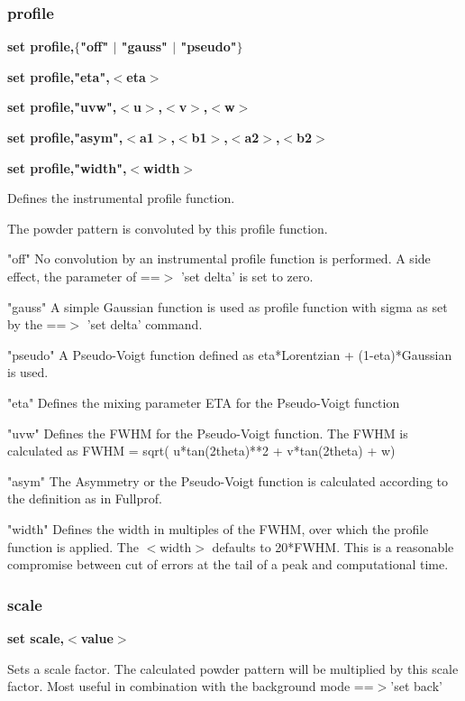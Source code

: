 \subsubsection{profile}
{\bf set profile,$ \{$"off" $| $ "gauss" $| $ "pseudo"$\} $ \par }
{\bf set profile,"eta",$ <$eta$> $ \par }
{\bf set profile,"uvw",$ <$u$> $,$ <$v$> $,$ <$w$> $ \par }
{\bf set profile,"asym",$ <$a1$> $,$ <$b1$> $,$ <$a2$> $,$ <$b2$> $ \par }
{\bf set profile,"width",$ <$width$> $ \par }
\par
\vspace{3pt}
Defines the instrumental profile function. 
\par
The powder pattern is convoluted by this profile function. 
\par
"off" 
No convolution by an instrumental profile function is performed. 
A side effect, the parameter of ==$> $ 'set delta' is set to zero. 
\par
"gauss" 
A simple Gaussian function is used as profile function with 
sigma as set by the ==$> $ 'set delta' command. 
\par
"pseudo" 
A Pseudo-Voigt function defined as eta*Lorentzian + (1-eta)*Gaussian 
is used. 
\par
"eta" 
Defines the mixing parameter ETA for the Pseudo-Voigt function 
\par
"uvw" 
Defines the FWHM for the Pseudo-Voigt function. The FWHM is 
calculated as FWHM = sqrt( u*tan(2theta)**2 + v*tan(2theta) + w) 
\par
"asym" 
The Asymmetry or the Pseudo-Voigt function is calculated according 
to the definition as in Fullprof. 
\par
"width" 
Defines the width in multiples of the FWHM, over which the profile 
function is applied. The $ <$width$> $ defaults to 20*FWHM. This is a 
reasonable compromise between cut of errors at the tail of a peak 
and computational time. 
\par
\subsubsection{scale}
{\bf set scale,$ <$value$> $ \par }
\par
\vspace{3pt}
Sets a scale factor. The calculated powder pattern will be 
multiplied by this scale factor. Most useful in combination 
with the background mode ==$> $'set back' 
